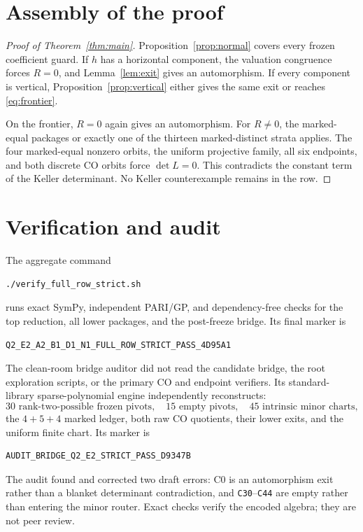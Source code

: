\documentclass[11pt]{article}
\theoremstyle{remark}
\begin{document}
\section{Assembly of the proof}

\begin{proof}[Proof of Theorem~\ref{thm:main}]
Proposition~\ref{prop:normal} covers every frozen coefficient guard.
If $h$ has a horizontal component, the valuation congruence forces $R=0$,
and Lemma~\ref{lem:exit} gives an automorphism.  If every component is
vertical, Proposition~\ref{prop:vertical} either gives the same exit or
reaches \eqref{eq:frontier}.

On the frontier, $R=0$ again gives an automorphism.  For $R\ne0$, the
marked-equal packages or exactly one of the thirteen marked-distinct
strata applies.  The four marked-equal nonzero orbits, the uniform
projective family, all six endpoints, and both discrete CO orbits force
$\det L=0$.  This contradicts the constant term of the Keller determinant.
No Keller counterexample remains in the row.
\end{proof}

\section{Verification and audit}

The aggregate command
\begin{verbatim}
./verify_full_row_strict.sh
\end{verbatim}
runs exact SymPy, independent PARI/GP, and dependency-free checks for the
top reduction, all lower packages, and the post-freeze bridge.  Its final
marker is
\begin{verbatim}
Q2_E2_A2_B1_D1_N1_FULL_ROW_STRICT_PASS_4D95A1
\end{verbatim}

The clean-room bridge auditor did not read the candidate bridge, the root
exploration scripts, or the primary CO and endpoint verifiers.  Its
standard-library sparse-polynomial engine independently reconstructs:
\[
30\text{ rank-two-possible frozen pivots},\quad
15\text{ empty pivots},\quad45\text{ intrinsic minor charts},
\]
the $4+5+4$ marked ledger, both raw CO quotients, their lower exits, and the
uniform finite chart.  Its marker is
\begin{verbatim}
AUDIT_BRIDGE_Q2_E2_STRICT_PASS_D9347B
\end{verbatim}

The audit found and corrected two draft errors: C0 is an automorphism exit
rather than a blanket determinant contradiction, and
\texttt{C30}--\texttt{C44} are empty rather than entering the minor router.
Exact checks verify the encoded algebra; they are not peer review.
\end{document}
